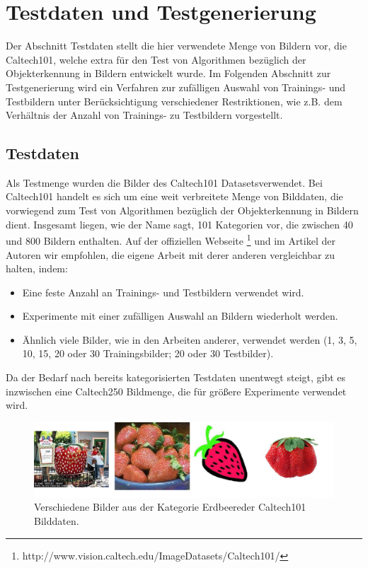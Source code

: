 \section{Testdaten und Testgenerierung}

Der Abschnitt Testdaten stellt die hier verwendete Menge von Bildern vor, die Caltech101, welche extra für den Test von Algorithmen bezüglich der Objekterkennung in Bildern entwickelt wurde.\newline
Im Folgenden Abschnitt zur Testgenerierung wird ein Verfahren zur zufälligen Auswahl von Trainings- und Testbildern unter Berücksichtigung verschiedener Restriktionen, wie z.B. dem Verhältnis der Anzahl von Trainings- zu Testbildern vorgestellt.

\subsection{Testdaten}

Als Testmenge wurden die Bilder des Caltech101 \glqq Datasets\grqq verwendet. Bei Caltech101 handelt es sich um eine weit verbreitete Menge von Bilddaten, die vorwiegend zum Test von Algorithmen bezüglich der Objekterkennung in Bildern dient. Insgesamt liegen, wie der Name sagt, 101 Kategorien vor, die zwischen 40 und 800 Bildern enthalten. Auf der offiziellen Webseite \footnote{http://www.vision.caltech.edu/Image\textunderscore Datasets/Caltech101/} und im Artikel der Autoren wir empfohlen, die eigene Arbeit mit derer anderen vergleichbar zu halten, indem:

\begin{itemize}
	\item Eine feste Anzahl an Trainings- und Testbildern verwendet wird.
	\item Experimente mit einer zufälligen Auswahl an Bildern wiederholt werden.
	\item Ähnlich viele Bilder, wie in den Arbeiten anderer, verwendet werden (1, 3, 5, 10, 15, 20 oder 30 Trainingsbilder; 20 oder 30 Testbilder).
\end{itemize}

Da der Bedarf nach bereits kategorisierten Testdaten unentwegt steigt, gibt es inzwischen eine Caltech250 Bildmenge, die für größere Experimente verwendet wird.

\begin{figure}
	\centering
	\includegraphics[scale=0.5]{images/strawberry.png}
	\caption{Verschiedene Bilder aus der Kategorie \glqq Erdbeere\grqq  der Caltech101 Bilddaten.}
	\label{img:strawberries}
\end{figure}

